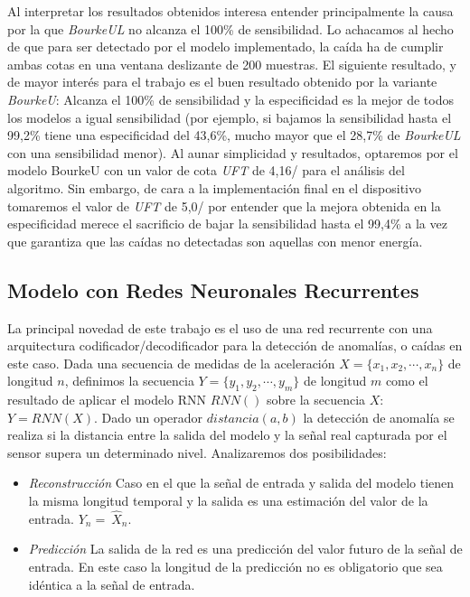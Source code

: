 
Al interpretar los resultados obtenidos interesa entender principalmente la causa por la que \textit{BourkeUL} no alcanza el 100\% de sensibilidad. Lo achacamos al hecho de que para ser detectado por el modelo implementado, la caída ha de cumplir ambas cotas en una ventana deslizante de 200 muestras. El siguiente resultado, y de mayor interés para el trabajo es el buen resultado obtenido por la variante \textit{BourkeU}: Alcanza el 100\% de sensibilidad y la especificidad es la mejor de todos los modelos a igual sensibilidad (por ejemplo, si bajamos la sensibilidad hasta el 99,2\% tiene una especificidad del 43,6\%, mucho mayor que el 28,7\% de \textit{BourkeUL} con una sensibilidad menor). Al aunar simplicidad y resultados, optaremos por el modelo BourkeU con un valor de cota \textit{UFT} de 4,16\g/ para el análisis del algoritmo. Sin embargo, de cara a la implementación final en el dispositivo tomaremos el valor de \textit{UFT} de 5,0\g/ por entender que la mejora obtenida en la especificidad merece el sacrificio de bajar la sensibilidad hasta el 99,4\% a la vez que garantiza que las caídas no detectadas son aquellas con menor energía.

\subsection{Modelo con Redes Neuronales Recurrentes}\label{sub:imp:model:rnn}

La principal novedad de este trabajo es el uso de una red recurrente con una arquitectura codificador/decodificador para la detección de anomalías, o caídas en este caso. Dada una secuencia de medidas de la aceleración $X=\{x_1,x_2,\cdots,x_n\}$ de longitud $n$, definimos la secuencia $Y=\{y_1, y_2, \cdots,y_m\}$ de longitud $m$ como el resultado de aplicar el modelo RNN $RNN()$ sobre la secuencia $X$: $Y=RNN(X)$. Dado un operador $distancia(a,b)$ la detección de anomalía se realiza si la distancia entre la salida del modelo y la señal real capturada por el sensor supera un determinado nivel. Analizaremos dos posibilidades:
\begin{itemize}
  \item \textsl{Reconstrucción} Caso en el que la señal de entrada y salida del modelo tienen la misma longitud temporal y la salida es una estimación del valor de la entrada. $Y_n =\ \hat{X}_n$.
  \item \textsl{Predicción} La salida de la red es una predicción del valor futuro de la señal de entrada. En este caso la longitud de la predicción no es obligatorio que sea idéntica a la señal de entrada.
\end{itemize}


